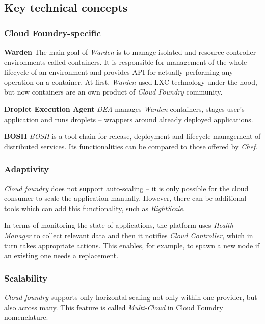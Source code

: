 \subsection{Key technical concepts}

\subsubsection{Cloud Foundry-specific}
\begin{asparaenum}
\item[\textbf{Warden}] The main goal of \emph{Warden} is to manage isolated and resource-controller environments called containers. It is responsible for management of the whole lifecycle of an environment and provides API for actually performing any operation on a container. At first, \emph{Warden} used LXC technology under the hood, but now containers are an own product of \emph{Cloud Foundry} community.
\item[\textbf{Droplet Execution Agent}] \emph{DEA} manages \emph{Warden} containers, stages user's application and runs droplets -- wrappers around already deployed applications.
\item[\textbf{BOSH}] \emph{BOSH} is a tool chain for release, deployment and lifecycle management of distributed services. Its functionalities can be compared to those offered by \emph{Chef}.
\end{asparaenum}

\subsubsection{Adaptivity}
\emph{Cloud foundry} does not support auto-scaling -- it is only possible for the cloud consumer to scale the application manually. However, there can be additional tools which can add this functionality, such as \emph{RightScale}.

In terms of monitoring the state of applications, the platform uses \emph{Health Manager} to collect relevant data and then it notifies \emph{Cloud Controller}, which in turn takes appropriate actions. This enables, for example, to spawn a new node if an existing one needs a replacement.

\subsubsection{Scalability}
\emph{Cloud foundry} supports only horizontal scaling not only within one provider, but also across many. This feature is called \emph{Multi-Cloud} in Cloud Foundry nomenclature.

